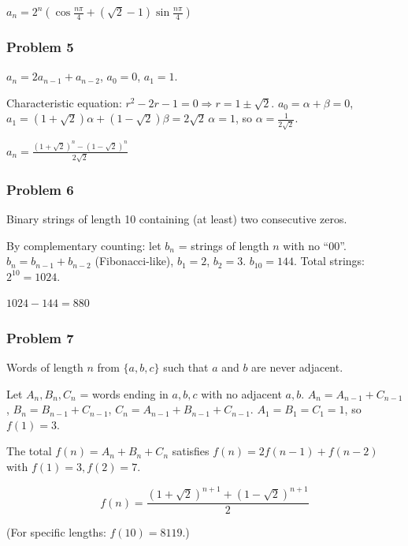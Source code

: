 $\boxed{a_n = 2^n\!\left(\cos\frac{n\pi}{4} + (\sqrt{2}-1)\sin\frac{n\pi}{4}\right)}$

\subsubsection*{Problem 5}
$a_n=2a_{n-1}+a_{n-2}$, $a_0=0$, $a_1=1$.

Characteristic equation: $r^2-2r-1=0 \Rightarrow r=1\pm\sqrt{2}$.
$a_0=\alpha+\beta=0$, $a_1=(1+\sqrt{2})\alpha+(1-\sqrt{2})\beta = 2\sqrt{2}\,\alpha=1$, so $\alpha=\frac{1}{2\sqrt{2}}$.

$\boxed{a_n = \frac{(1+\sqrt{2})^n - (1-\sqrt{2})^n}{2\sqrt{2}}}$

\subsubsection*{Problem 6}
Binary strings of length 10 containing (at least) two consecutive zeros.

By complementary counting: let $b_n$ = strings of length $n$ with no ``00''.
$b_n = b_{n-1}+b_{n-2}$ (Fibonacci-like), $b_1=2$, $b_2=3$.
$b_{10}=144$. Total strings: $2^{10}=1024$.

$\boxed{1024-144=880}$

\subsubsection*{Problem 7}
Words of length $n$ from $\{a,b,c\}$ such that $a$ and $b$ are never adjacent.

Let $A_n, B_n, C_n$ = words ending in $a, b, c$ with no adjacent $a,b$.
$A_n = A_{n-1}+C_{n-1}$, $B_n = B_{n-1}+C_{n-1}$, $C_n = A_{n-1}+B_{n-1}+C_{n-1}$.
$A_1=B_1=C_1=1$, so $f(1)=3$.

The total $f(n) = A_n+B_n+C_n$ satisfies $f(n)=2f(n-1)+f(n-2)$ with $f(1)=3, f(2)=7$.

\[
\boxed{f(n) = \frac{(1+\sqrt{2})^{n+1} + (1-\sqrt{2})^{n+1}}{2}}
\]

(For specific lengths: $f(10)=8119$.)
